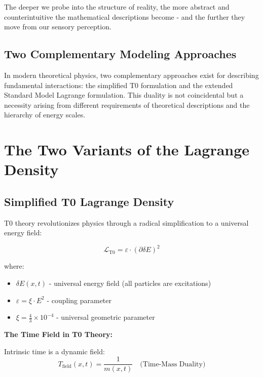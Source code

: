 	The deeper we probe into the structure of reality, the more abstract and counterintuitive the mathematical descriptions become - and the further they move from our sensory perception.
	
	\subsection{Two Complementary Modeling Approaches}
	
	In modern theoretical physics, two complementary approaches exist for describing fundamental interactions: the simplified T0 formulation and the extended Standard Model Lagrange formulation. This duality is not coincidental but a necessity arising from different requirements of theoretical descriptions and the hierarchy of energy scales.
	
	\section{The Two Variants of the Lagrange Density}
	
	\subsection{Simplified T0 Lagrange Density}
	
	T0 theory revolutionizes physics through a radical simplification to a universal energy field:
	
	\begin{t0box}
		\begin{equation}
			\mathcal{L}_{\text{T0}} = \varepsilon \cdot (\partial\delta E)^2
		\end{equation}
		
		where:
		\begin{itemize}
			\item $\delta E(x,t)$ - universal energy field (all particles are excitations)
			\item $\varepsilon = \xi \cdot E^2$ - coupling parameter
			\item $\xi = \frac{4}{3} \times 10^{-4}$ - universal geometric parameter
		\end{itemize}
	\end{t0box}
	
	\textbf{The Time Field in T0 Theory:}
	
	Intrinsic time is a dynamic field:
	\begin{equation}
		T_{\text{field}}(x,t) = \frac{1}{m(x,t)} \quad \text{(Time-Mass Duality)}
	\end{equation}
	
